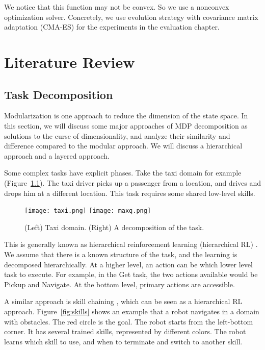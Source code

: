 \documentclass[12pt]{report}	%
\theoremstyle{definition}
\theoremstyle{remark}
\begin{document}
We notice that this function may not be convex. So we use a nonconvex optimization
solver. Concretely, we use evolution strategy with covariance matrix adaptation (CMA-ES)
\cite{hansen2003reducing} for the experiments in the evaluation chapter.


\chapter{Literature Review}
\label{chp:lr}
\section{Task Decomposition}

Modularization is one approach to reduce the dimension of the state space. In
this section, we will discuss some major approaches of MDP decomposition as
solutions to the curse of dimensionality, and analyze their similarity and
difference compared to the modular approach. We will discuss a hierarchical
approach and a layered approach.

Some complex tasks have explicit phases. Take the taxi domain for example
(Figure~\ref{fig:taxi}). The taxi driver picks up a passenger from a location,
and drives and drops him at a different location. This task requires some shared
low-level skills.

\begin{figure}[h]
\centering
\texttt{[image: taxi.png]}
\texttt{[image: maxq.png]}
\caption{(Left) Taxi domain. (Right) A decomposition of the task.}
\label{fig:taxi}
\end{figure}

This is generally known as hierarchical reinforcement learning (hierarchical RL)
\cite{dietterich2000hierarchical}.
We assume that there is a known structure of the task, and the
learning is decomposed hierarchically. At a higher level, an action can be
which lower level task to execute. For example, in the Get task, the two actions
available would be Pickup and Navigate. At the bottom level, primary actions are
accessible.

A similar approach is skill chaining \cite{konidaris2009skill}, which can
be seen as a hierarchical RL approach. Figure~\ref{fig:skills} shows
an example that a robot navigates in a domain with obstacles. The red circle is
the goal. The robot starts from the left-bottom corner. It has several trained
skills, represented by different colors. The robot learns which skill to use,
and when to terminate and switch to another skill.
\end{document}
